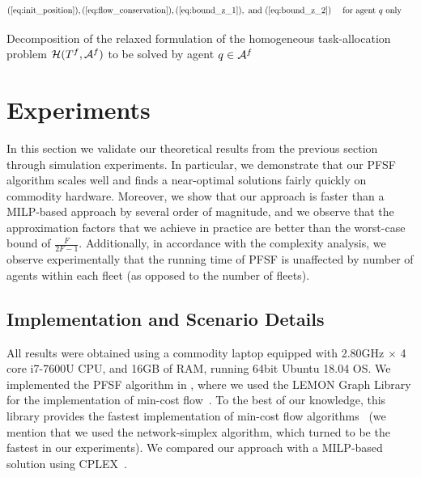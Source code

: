 \documentclass[conference]{IEEEtran}
\begin{document}
\begin{table}[!ht]
{\begin{minipage}[t]{1\textwidth - 2\fboxsep - 2\fboxrule}
\begin{subequations}
\begin{align}
(\ref{eq:init_position}), (\ref{eq:flow_conservation}), (\ref{eq:bound_z_1}), \textrm{ and } (\ref{eq:bound_z_2}) & & & \textrm{ for agent } q \textrm{ only } \nonumber
\end{align}
\end{subequations}
    \end{minipage}}
\vspace{5pt}
\caption{Decomposition of the relaxed formulation of the homogeneous task-allocation problem $\mathcal{H}(T^f, \mathcal{A}^f)$ to be solved by agent $q \in \mathcal{A}^f$}
\label{tbl:problem_homo_relaxed_decomposed}
\end{table}

\section{Experiments}\label{sec:experiments}
In this section we validate our theoretical results from the previous section through simulation experiments. In particular, we demonstrate that our PFSF algorithm  scales well and finds a near-optimal solutions fairly quickly on commodity hardware. Moreover, we show that our approach is faster than a MILP-based approach by several order of magnitude, and we observe that the approximation factors that we achieve in practice are better than the worst-case bound of $\frac{F}{2F-1}$. Additionally, in accordance with the complexity analysis, we observe experimentally that the running time of PFSF is unaffected by number of agents within each fleet (as opposed to the number of fleets).

\subsection{Implementation and Scenario Details}
All results were obtained using a commodity laptop equipped with 2.80GHz $\times$ 4 core i7-7600U CPU, and 16GB of RAM, running 64bit Ubuntu 18.04 OS. We implemented the PFSF algorithm in \cpp, where we used the LEMON Graph Library for the implementation of min-cost flow~\cite{Lemon}. To the best of our knowledge, this library provides the fastest implementation of min-cost flow algorithms~\cite{Kovacs15} (we mention that we used the network-simplex algorithm, which turned to be the fastest in our experiments). We compared our approach with a MILP-based solution using CPLEX~\cite{Cplex}.
\end{document}
